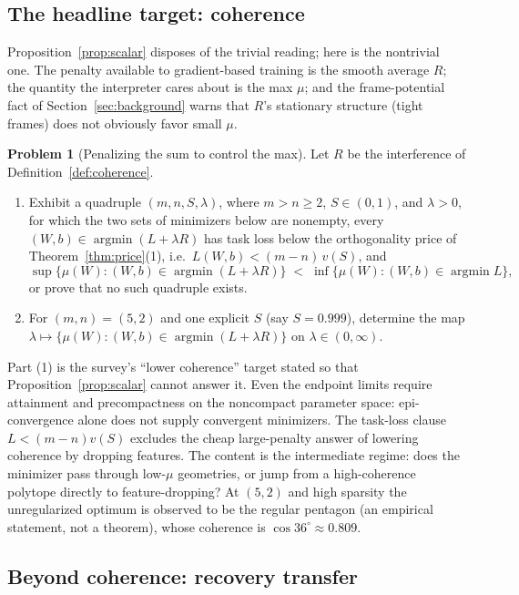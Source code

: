 \documentclass[11pt]{amsart}
\theoremstyle{plain}
\theoremstyle{definition}
\newtheorem{problem}[theorem]{Problem}
\begin{document}
\subsection{The headline target: coherence}

Proposition~\ref{prop:scalar} disposes of the trivial reading; here is the nontrivial one. The penalty available to gradient-based training is the smooth average $R$; the quantity the interpreter cares about is the max $\mu$; and the frame-potential fact of Section~\ref{sec:background} warns that $R$'s stationary structure (tight frames) does not obviously favor small $\mu$.

\begin{problem}[Penalizing the sum to control the max]\label{prob:summax}
Let $R$ be the interference of Definition~\ref{def:coherence}.
\begin{enumerate}
\item Exhibit a quadruple $(m,n,S,\lambda)$, where $m>n\ge2$, $S\in(0,1)$, and $\lambda>0$, for which the two sets of minimizers below are nonempty, every $(W,b)\in\operatorname{argmin}(L+\lambda R)$ has task loss below the orthogonality price of Theorem~\ref{thm:price}(1), i.e.\ $L(W,b)<(m-n)\,v(S)$, and
\[
\sup\bigl\{\mu(W) : (W,b)\in\operatorname{argmin}(L+\lambda R)\bigr\}
\;<\;
\inf\bigl\{\mu(W) : (W,b)\in\operatorname{argmin} L\bigr\} ,
\]
or prove that no such quadruple exists.
\item For $(m,n)=(5,2)$ and one explicit $S$ (say $S=0.999$), determine the map
$\lambda \mapsto \{\mu(W) : (W,b)\in\operatorname{argmin}(L+\lambda R)\}$ on $\lambda\in(0,\infty)$.
\end{enumerate}
\end{problem}

Part (1) is the survey's ``lower coherence'' target stated so that Proposition~\ref{prop:scalar} cannot answer it. Even the endpoint limits require attainment and precompactness on the noncompact parameter space: epi-convergence alone does not supply convergent minimizers. The task-loss clause $L<(m-n)v(S)$ excludes the cheap large-penalty answer of lowering coherence by dropping features. The content is the intermediate regime: does the minimizer pass through low-$\mu$ geometries, or jump from a high-coherence polytope directly to feature-dropping? At $(5,2)$ and high sparsity the unregularized optimum is observed to be the regular pentagon \cite{elhage2022} (an empirical statement, not a theorem), whose coherence is $\cos 36^\circ\approx0.809$.

\subsection{Beyond coherence: recovery transfer}
\end{document}
